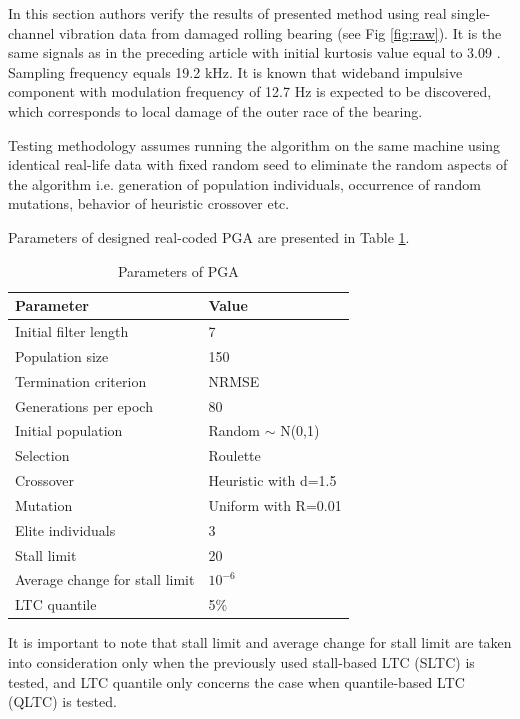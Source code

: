 \documentclass{svproc}
\begin{document}
In this section authors verify the results of presented method using real single-channel vibration data from damaged rolling bearing (see Fig \ref{fig:raw}). It is the same signals as in the preceding article with initial kurtosis value equal to 3.09 \cite{wodecki2018optimal}. Sampling frequency equals 19.2 kHz. It is known that wideband impulsive component with modulation frequency of 12.7 Hz is expected to be discovered, which corresponds to local damage of the outer race of the bearing.

Testing methodology assumes running the algorithm on the same machine using identical real-life data with fixed random seed to eliminate the random aspects of the algorithm i.e. generation of population individuals, occurrence of random mutations, behavior of heuristic crossover etc.


Parameters of designed real-coded PGA are presented in Table \ref{tab:tab1}.

\begin{table}[ht!]
    \centering
    \caption{Parameters of PGA}
    \begin{tabular}{|l|l|}
    \hline
         \textbf{Parameter} & \textbf{Value} \\ \hline
         Initial filter length & 7 \\ \hline
         Population size & 150 \\ \hline
         Termination criterion & NRMSE \\ \hline
         Generations per epoch & 80 \\ \hline
         Initial population & Random $\sim$ N(0,1) \\ \hline
         Selection & Roulette \\ \hline
         Crossover & Heuristic with d=1.5 \\ \hline
         Mutation & Uniform with R=0.01 \\ \hline
         Elite individuals & 3 \\ \hline
         Stall limit & 20 \\ \hline
         Average change for stall limit & $10^{-6}$ \\ \hline
         LTC quantile & 5\% \\
    \hline
    \end{tabular}
    \label{tab:tab1}
\end{table}

It is important to note that stall limit and average change for stall limit are taken into consideration only when the previously used stall-based LTC (SLTC) is tested, and LTC quantile only concerns the case when quantile-based LTC (QLTC) is tested.
\end{document}
